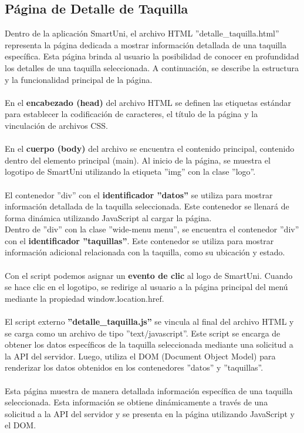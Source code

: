 \documentclass[12pt]{report}
\begin{document}
\subsection{Página de Detalle de Taquilla}
Dentro de la aplicación SmartUni, el archivo HTML ''detalle\_taquilla.html'' representa la página dedicada a mostrar información detallada de una taquilla específica. Esta página brinda al usuario la posibilidad de conocer en profundidad los detalles de una taquilla seleccionada. A continuación, se describe la estructura y la funcionalidad principal de la página.
\\\\
En el \textbf{encabezado (head)} del archivo HTML se definen las etiquetas estándar para establecer la codificación de caracteres, el título de la página y la vinculación de archivos CSS.
\\\\
En el \textbf{cuerpo (body)} del archivo se encuentra el contenido principal, contenido dentro del elemento principal (main). Al inicio de la página, se muestra el logotipo de SmartUni utilizando la etiqueta ''img'' con la clase ''logo''.
\\\\
El contenedor ''div'' con el \textbf{identificador ''datos''} se utiliza para mostrar información detallada de la taquilla seleccionada. Este contenedor se llenará de forma dinámica utilizando JavaScript al cargar la página.
\\
Dentro de ''div'' con la clase ''wide-menu menu'', se encuentra el contenedor ''div'' con el \textbf{identificador ''taquillas''}. Este contenedor se utiliza para mostrar información adicional relacionada con la taquilla, como su ubicación y estado.
\\\\
Con el script podemos asignar un \textbf{evento de clic} al logo de SmartUni. Cuando se hace clic en el logotipo, se redirige al usuario a la página principal del menú mediante la propiedad window.location.href.
\\\\
El script externo \textbf{''detalle\_taquilla.js''} se vincula al final del archivo HTML y se carga como un archivo de tipo ''text/javascript''. Este script se encarga de obtener los datos específicos de la taquilla seleccionada mediante una solicitud a la API del servidor. Luego, utiliza el DOM (Document Object Model) para renderizar los datos obtenidos en los contenedores ''datos'' y ''taquillas''.\\\\
Esta página muestra de manera detallada información específica de una taquilla seleccionada. Esta información se obtiene dinámicamente a través de una solicitud a la API del servidor y se presenta en la página utilizando JavaScript y el DOM.
\end{document}
